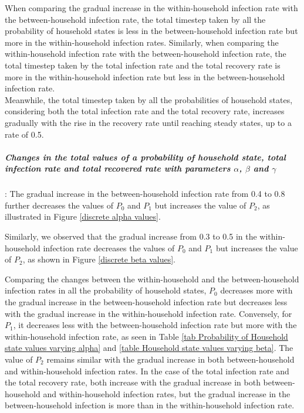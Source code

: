 \documentclass[paper=a4, fontsize=11pt, twoside, BCOR=12mm, parskip=full, listof=totoc]{scrreprt}
\begin{document}
{When comparing the gradual increase in the within-household infection rate with the between-household infection rate, the total timestep taken by all the probability of household states is less in the between-household infection rate but more in the within-household infection rates. Similarly, when comparing the within-household infection rate with the between-household infection rate, the total timestep taken by the total infection rate and the total recovery rate is more in the within-household infection rate but less in the between-household infection rate. \\
Meanwhile, the total timestep taken by all the probabilities of household states, considering both the total infection rate and the total recovery rate, increases gradually with the rise in the recovery rate until reaching steady states, up to a rate of 0.5.  
\subparagraph*{Changes in the total values of a probability of household state, total infection rate and total recovered rate with parameters $\alpha$, $\beta$ and $\gamma$}:
The gradual increase in the between-household infection rate from 0.4 to 0.8 further decreases the values of \(P_0\) and \(P_1\) but increases the value of \(P_2\), as illustrated in Figure \ref{discrete alpha values}.

Similarly, we observed that the gradual increase from 0.3 to 0.5 in the within-household infection rate decreases the values of \(P_0\) and \(P_1\) but increases the value of \(P_2\), as shown in Figure \ref{discrete beta values}.

Comparing the changes between the within-household and the between-household infection rates in all the probability of household states, \(P_0\) decreases more with the gradual increase in the between-household infection rate but decreases less with the gradual increase in the within-household infection rate. Conversely, for \(P_1\), it decreases less with the between-household infection rate but more with the within-household infection rate, as seen in Table \ref{tab Probability of Household state values varying alpha} and \ref{table Household state values varying beta}. The value of \(P_2\) remains similar with the gradual increase in both between-household and within-household infection rates. In the case of the total infection rate and the total recovery rate, both increase with the gradual increase in both between-household and within-household infection rates, but the gradual increase in the between-household infection is more than in the within-household infection rate.

}
\end{document}
